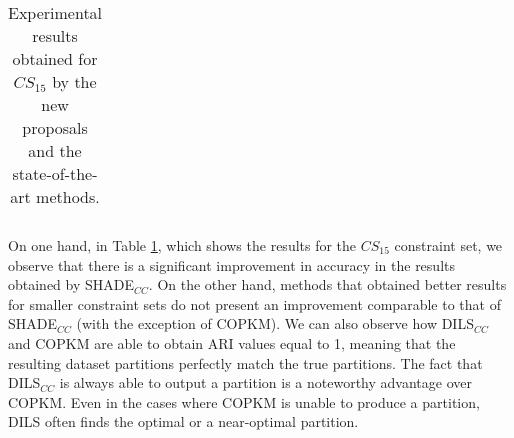 \begin{table}[!h]
{\begin{tabular}{lcccccccc}
	\end{tabular}}
	
	\caption{Experimental results obtained for $CS_{15}$ by the new proposals and the state-of-the-art methods.}
	\label{tab:resultsSOTA15}
\end{table}

On one hand, in Table \ref{tab:resultsSOTA15}, which shows the results for the $CS_{15}$ constraint set, we observe that there is a significant improvement in accuracy in the results obtained by \acs{SHADE}$_{CC}$. On the other hand, methods that obtained better results for smaller constraint sets do not present an improvement comparable to that of \acs{SHADE}$_{CC}$ (with the exception of \acs{COPKM}). We can also observe how \acs{DILS}$_{CC}$ and \acs{COPKM} are able to obtain \acs{ARI} values equal to 1, meaning that the resulting dataset partitions perfectly match the true partitions. The fact that \acs{DILS}$_{CC}$ is always able to output a partition is a noteworthy advantage over \acs{COPKM}. Even in the cases where \acs{COPKM} is unable to produce a partition, \acs{DILS} often finds the optimal or a near-optimal partition.

